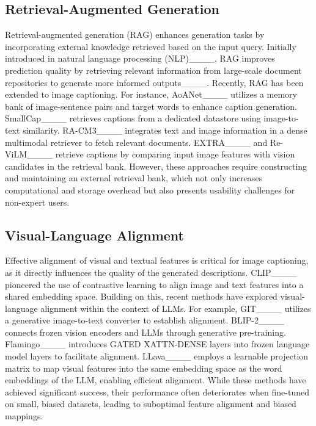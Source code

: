 \subsection{Retrieval-Augmented Generation}
Retrieval-augmented generation (RAG) enhances generation tasks by incorporating external knowledge retrieved based on the input query. Initially introduced in natural language processing (NLP)____, RAG improves prediction quality by retrieving relevant information from large-scale document repositories to generate more informed outputs____. Recently, RAG has been extended to image captioning. For instance, AoANet____ utilizes a memory bank of image-sentence pairs and target words to enhance caption generation. SmallCap____ retrieves captions from a dedicated datastore using image-to-text similarity. RA-CM3____ integrates text and image information in a dense multimodal retriever to fetch relevant documents. EXTRA____ and Re-ViLM____ retrieve captions by comparing input image features with vision candidates in the retrieval bank.
However, these approaches require constructing and maintaining an external retrieval bank, which not only increases computational and storage overhead but also presents usability challenges for non-expert users. 

\subsection{Visual-Language Alignment}
Effective alignment of visual and textual features is critical for image captioning, as it directly influences the quality of the generated descriptions. CLIP____ pioneered the use of contrastive learning to align image and text features into a shared embedding space. Building on this, recent methods have explored visual-language alignment within the context of LLMs. For example, GIT____ utilizes a generative image-to-text converter to establish alignment. BLIP-2____ connects frozen vision encoders and LLMs through generative pre-training. Flamingo____ introduces GATED XATTN-DENSE layers into frozen language model layers to facilitate alignment. LLava____ employs a learnable projection matrix to map visual features into the same embedding space as the word embeddings of the LLM, enabling efficient alignment.
While these methods have achieved significant success, their performance often deteriorates when fine-tuned on small, biased datasets, leading to suboptimal feature alignment and biased mappings. 

